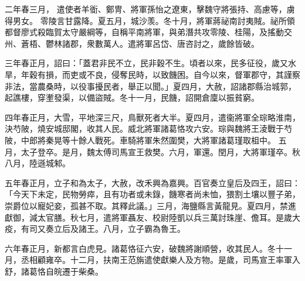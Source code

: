 \begin{pinyinscope}
 
二年春三月，
 遣使者羊衜、鄭冑、將軍孫怡之遼東，擊魏守將張持、高慮等，虜得男女。
 零陵言甘露降。夏五月，城沙羡。冬十月，將軍蔣祕南討夷賊。祕所領都督廖式殺臨賀太守嚴綱等，自稱平南將軍，與弟潛共攻零陵、桂陽，及搖動交州、蒼梧、鬱林諸郡，衆數萬人。遣將軍呂岱、唐咨討之，歲餘皆破。
 
 
 
 
 三年春正月，詔曰：「蓋君非民不立，民非穀不生。頃者以來，民多征役，歲又水旱，年穀有損，而吏或不良，侵奪民時，以致饑困。自今以來，督軍郡守，其謹察非法，當農桑時，以役事擾民者，舉正以聞。」夏四月，大赦，詔諸郡縣治城郭，起譙樓，穿壍發渠，以備盜賊。冬十一月，民饑，詔開倉廩以振貧窮。
 
 
四年春正月，大雪，平地深三尺，鳥獸死者大半。夏四月，遣衞將軍全琮略淮南，決芍陂，燒安城邸閣，收其人民。威北將軍諸葛恪攻六安。琮與魏將王淩戰于芍陂，中郎將秦晃等十餘人戰死。車騎將軍朱然圍樊，大將軍諸葛瑾取柤中。
 五月，太子登卒。是月，魏太傅司馬宣王救樊。六月，軍還。閏月，大將軍瑾卒。秋八月，陸遜城邾。
 
 
 
 
 五年春正月，立子和為太子，大赦，改禾興為嘉興。百官奏立皇后及四王，詔曰：「今天下未定，民物勞瘁，且有功者或未錄，饑寒者尚未恤，猥割土壤以豐子弟，崇爵位以寵妃妾，孤甚不取。其釋此議。」三月，海鹽縣言黃龍見。夏四月，禁進獻御，減太官膳。秋七月，遣將軍聶友、校尉陸凱以兵三萬討珠崖、儋耳。是歲大疫，有司又奏立后及諸王。八月，立子霸為魯王。
 
 
 
 
 六年春正月，新都言白虎見。諸葛恪征六安，破魏將謝順營，收其民人。冬十一月，丞相顧雍卒。十二月，扶南王范旃遣使獻樂人及方物。是歲，司馬宣王率軍入舒，諸葛恪自皖遷于柴桑。
 

\end{pinyinscope}
